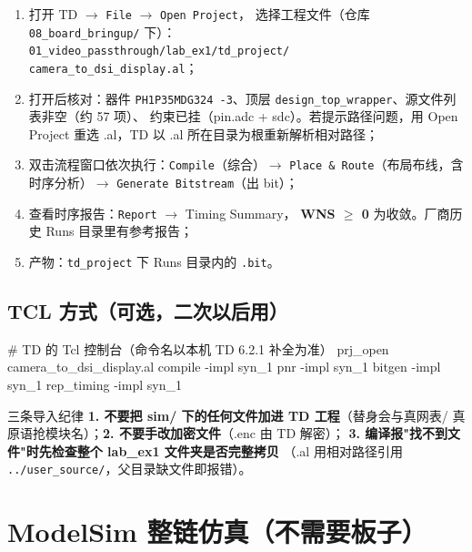 \documentclass[11pt]{ctexart}
\newcommand{\code}[1]{\texttt{#1}}
\begin{document}
\begin{enumerate}
  \item 打开 TD $\rightarrow$ \code{File} $\rightarrow$ \code{Open Project}，
        选择工程文件（仓库 \code{08\_board\_bringup/} 下）：\\
        \code{01\_video\_passthrough/lab\_ex1/td\_project/}\\
        \code{camera\_to\_dsi\_display.al}；
  \item 打开后核对：器件 \code{PH1P35MDG324 -3}、顶层
        \code{design\_top\_wrapper}、源文件列表非空（约 57 项）、
        约束已挂（pin.adc + sdc）。若提示路径问题，用 Open Project
        重选 .al，TD 以 .al 所在目录为根重新解析相对路径；
  \item 双击流程窗口依次执行：\code{Compile}（综合）$\rightarrow$
        \code{Place \& Route}（布局布线，含时序分析）$\rightarrow$
        \code{Generate Bitstream}（出 bit）；
  \item 查看时序报告：\code{Report} $\rightarrow$ Timing Summary，
        \textbf{WNS $\geq$ 0} 为收敛。厂商历史 Runs 目录里有参考报告；
  \item 产物：\code{td\_project} 下 Runs 目录内的 \code{.bit}。
\end{enumerate}

\subsection{TCL 方式（可选，二次以后用）}

\begin{Verilog}
# TD 的 Tcl 控制台（命令名以本机 TD 6.2.1 补全为准）
prj_open camera_to_dsi_display.al
compile -impl syn_1
pnr     -impl syn_1
bitgen  -impl syn_1
rep_timing -impl syn_1
\end{Verilog}

\begin{warnbox}{三条导入纪律}
\textbf{1. 不要把 sim/ 下的任何文件加进 TD 工程}（替身会与真网表/
真原语抢模块名）；\textbf{2. 不要手改加密文件}（.enc 由 TD 解密）；
\textbf{3. 编译报"找不到文件"时先检查整个 lab\_ex1 文件夹是否完整拷贝}
（.al 用相对路径引用 \code{../user\_source/}，父目录缺文件即报错）。
\end{warnbox}

\section{ModelSim 整链仿真（不需要板子）}
\end{document}
